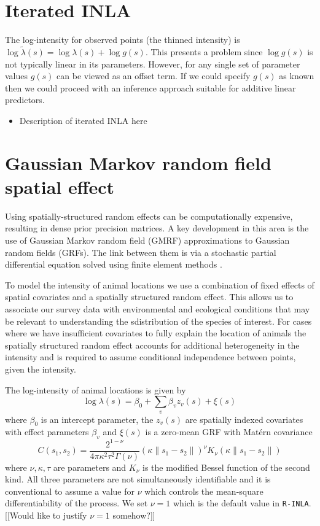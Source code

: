 \documentclass[preprint,12pt]{elsarticle}
\newcommand{\tl}{\tilde{\lambda}}   %
\begin{document}
\section{Iterated INLA}

The log-intensity for observed points (the thinned intensity) is $\log\tl(s) = \log\lambda(s) + \log g(s)$.  This presents a problem since $\log g(s)$ is not typically linear in its parameters. However, for any single set of parameter values $g(s)$ can be viewed as an offset term. If we could specify $g(s)$ as known then we could proceed with an inference approach suitable for additive linear predictors.

\begin{itemize}
 \item Description of iterated INLA here
\end{itemize}

\section{Gaussian Markov random field spatial effect}

Using spatially-structured random effects can be computationally expensive, resulting in dense prior precision matrices.  A key development in this area is the use of Gaussian Markov random field (GMRF) approximations to Gaussian random fields (GRFs).  The link between them is via a stochastic partial differential equation solved using finite element methods \citep{lindgren_explicit_2011}.

To model the intensity of animal locations we use a combination of fixed effects of spatial covariates and a spatially structured random effect.  This allows us to associate our survey data with environmental and ecological conditions that may be relevant to understanding the sdistribution of the species of interest.  For cases where we have insufficient covariates to fully explain the location of animals the spatially structured random effect accounts for additional heterogeneity in the intensity and is required to assume conditional independence between points, given the intensity.

The log-intensity of animal locations is given by
\begin{equation*}
\log \lambda(s) = \beta_0 + \sum_v \beta_v z_v(s) + \xi(s)
\end{equation*}
where $\beta_0$ is an intercept parameter, the $z_v(s)$ are spatially indexed covariates with effect parameters $\beta_v$ and $\xi(s)$ is a zero-mean GRF with Mat\'ern covariance
\begin{equation}
C(s_1,s_2) = \frac{2^{1-\nu}}{4\pi\kappa^2\tau^2\Gamma(\nu)}(\kappa \|s_1-s_2\|)^{\nu}K_\nu(\kappa \|s_1-s_2\|)
\end{equation}
where \(\nu, \kappa, \tau\) are parameters and \(K_{\nu}\) is the modified Bessel function of the second kind.  All three parameters are not simultaneously identifiable \citep{zhang_inconsistent_2004} and it is conventional to assume a value for $\nu$ which controls the mean-square differentiability of the process.  We set $\nu = 1$ which is the default value in \texttt{R-INLA}. [[Would like to justify $\nu = 1$ somehow?]]
\end{document}

